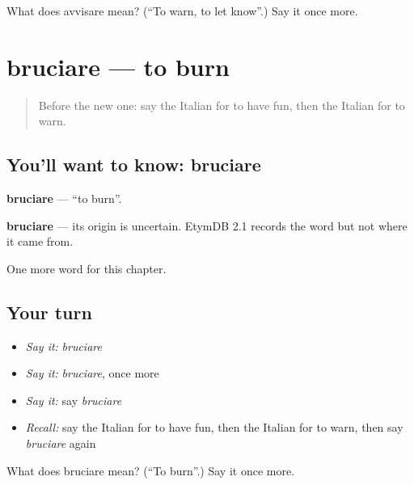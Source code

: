 \begin{tcolorbox}[breakable,colback=teal!4,colframe=teal!35!black,title={Before you move on}]
What does avvisare mean? (\textquotedblleft{}To warn, to let know\textquotedblright{}.) Say it once more.
\end{tcolorbox}
\section[bruciare]{bruciare — to burn}

\label{lesson:IT-C237-bruciare}



\begin{quote}
Before the new one: say the Italian for to have fun, then the Italian for to warn.
\end{quote}

\subsection*{You'll want to know: bruciare}
\textbf{bruciare} — \textquotedblleft{}to burn\textquotedblright{}.

\begin{cousinweb}
\textbf{bruciare} — its origin is uncertain. EtymDB 2.1 records the word but not where it came from.
\end{cousinweb}

\begin{grammarlens}[title={What you've built}]
One more word for this chapter.
\end{grammarlens}

\subsection*{Your turn}
\begin{itemize}
\raggedright
  \item \emph{Say it:} \emph{bruciare}
  \item \emph{Say it:} \emph{bruciare}, once more
  \item \emph{Say it:} say \emph{bruciare}
  \item \emph{Recall:} say the Italian for to have fun, then the Italian for to warn, then say \emph{bruciare} again
\end{itemize}

\begin{tcolorbox}[breakable,colback=teal!4,colframe=teal!35!black,title={Before you move on}]
What does bruciare mean? (\textquotedblleft{}To burn\textquotedblright{}.) Say it once more.
\end{tcolorbox}
